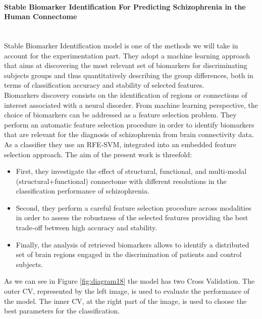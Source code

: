 \paragraph{Stable Biomarker Identification For Predicting Schizophrenia in the Human Connectome}\
\label{par:4}
\\

Stable Biomarker Identification model \cite{GutierrezBio} is one of the methods we will take in account for the experimentation part. They adopt a machine learning approach that aims at discovering the most relevant set of biomarkers for discriminating subjects groups and thus quantitatively describing the group differences, both in terms of classification accuracy and stability of selected features. 
\\

Biomarkers discovery consists on the identification of regions or connections of interest associated with a neural disorder. From machine learning perspective, the choice of biomarkers can be addressed as a feature selection problem. They perform an automatic feature selection procedure in order to identify biomarkers that are relevant for the diagnosis of schizophrenia from brain connectivity data. As a classifier they use an RFE-SVM, integrated into an embedded feature selection approach. The aim of the present work is threefold:

\begin{itemize}
	\item First, they investigate the effect of structural, functional, and multi-modal (structural+functional) connectome with different resolutions in the classification performance of schizophrenia.
	\item Second, they perform a careful feature selection procedure across modalities in order to assess the robustness of the selected features providing the best trade-off between high accuracy and stability. 
	\item Finally, the analysis of retrieved biomarkers allows to identify a distributed set of brain regions engaged in the discrimination of patients and control subjects.
\end{itemize}  

As we can see in Figure \ref{fig:diagram18} the model has two Cross Validation. The outer CV, represented by the left image, is used to evaluate the performance of the model. The inner CV, at the right part of the image, is used to choose the best parameters for the classification.

